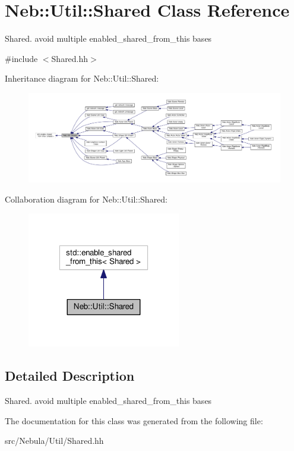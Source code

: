 \hypertarget{classNeb_1_1Util_1_1Shared}{\section{Neb\-:\-:Util\-:\-:Shared Class Reference}
\label{classNeb_1_1Util_1_1Shared}
}


Shared. avoid multiple enabled\-\_\-shared\-\_\-from\-\_\-this bases  




{\ttfamily \#include $<$Shared.\-hh$>$}



Inheritance diagram for Neb\-:\-:Util\-:\-:Shared\-:
\nopagebreak
\begin{figure}[H]
\begin{center}
\leavevmode
\includegraphics[width=350pt]{classNeb_1_1Util_1_1Shared__inherit__graph}
\end{center}
\end{figure}


Collaboration diagram for Neb\-:\-:Util\-:\-:Shared\-:
\nopagebreak
\begin{figure}[H]
\begin{center}
\leavevmode
\includegraphics[width=190pt]{classNeb_1_1Util_1_1Shared__coll__graph}
\end{center}
\end{figure}


\subsection{Detailed Description}
Shared. avoid multiple enabled\-\_\-shared\-\_\-from\-\_\-this bases 

The documentation for this class was generated from the following file\-:\begin{DoxyCompactItemize}
\item 
src/\-Nebula/\-Util/Shared.\-hh\end{DoxyCompactItemize}
